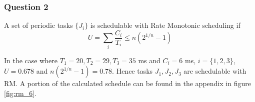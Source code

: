 \subsubsection{Question 2}

A set of periodic tasks $\{J_i\}$ is schedulable with Rate Monotonic scheduling
if $$U = \sum_{i} \dfrac{C_i}{T_i} \leq n(2^{1/n} - 1)$$

In the case where $T_1 = 20, T_2 = 29, T_3 = 35$ ms and $C_i = 6$ ms,
$i=\{1,2,3\}$, $U=0.678$ and $n(2^{1/n} - 1) = 0.78$. Hence tasks $J_1, J_2, J_3$
are schedulable with RM. A portion of the calculated schedule can be found in
the appendix in figure \ref{fig:rm_6}.
